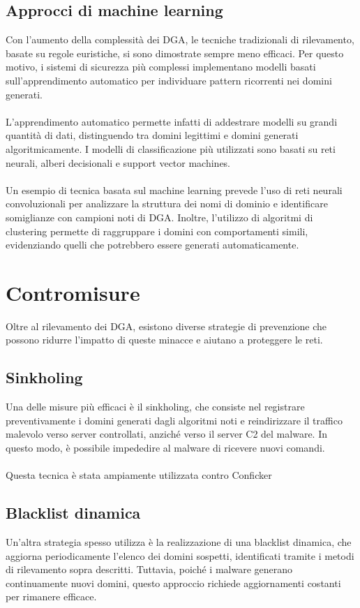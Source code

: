 \subsection*{Approcci di machine learning} 
Con l'aumento della complessità dei DGA, le tecniche tradizionali 
di rilevamento, basate su regole euristiche, si sono dimostrate sempre 
meno efficaci. Per questo motivo, i sistemi di sicurezza più complessi
implementano modelli basati sull'apprendimento automatico per individuare pattern 
ricorrenti nei domini generati. 
\\\\
L'apprendimento automatico permette infatti di addestrare modelli 
su grandi quantità di dati, distinguendo tra domini legittimi e 
domini generati algoritmicamente. I modelli di classificazione 
più utilizzati sono basati su reti neurali, alberi decisionali e 
support vector machines. 
\\\\
Un esempio di tecnica basata sul machine learning prevede l'uso 
di reti neurali convoluzionali per analizzare la struttura dei nomi 
di dominio e identificare somiglianze con campioni noti di DGA. 
Inoltre, l'utilizzo di algoritmi di clustering permette di 
raggruppare i domini con comportamenti simili, evidenziando quelli 
che potrebbero essere generati automaticamente.  

\section*{Contromisure}
Oltre al rilevamento dei DGA, esistono diverse strategie di 
prevenzione che possono ridurre l'impatto di queste minacce 
e aiutano a proteggere le reti.

\subsection*{Sinkholing}
Una delle misure più efficaci è il sinkholing, che 
consiste nel registrare preventivamente i domini 
generati dagli algoritmi noti e reindirizzare il traffico malevolo
verso server controllati, anziché verso il server C2 del malware.
In questo modo, è possibile impededire al malware di ricevere nuovi 
comandi. 
\\\\
Questa tecnica è stata ampiamente utilizzata contro Conficker

\subsection*{Blacklist dinamica}
Un'altra strategia spesso utilizza è la realizzazione di una 
blacklist dinamica, che aggiorna periodicamente l'elenco dei domini 
sospetti, identificati tramite i metodi di rilevamento sopra descritti. 
Tuttavia, poiché i malware generano continuamente nuovi domini, 
questo approccio richiede aggiornamenti costanti per rimanere efficace.  

